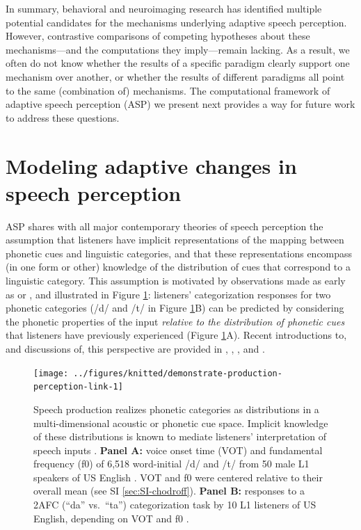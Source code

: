 \documentclass[
  11pt,
  man,floatsintext]{apa6}
\begin{document}
In summary, behavioral and neuroimaging research has identified multiple potential candidates for the mechanisms underlying adaptive speech perception. However, contrastive comparisons of competing hypotheses about these mechanisms---and the computations they imply---remain lacking. As a result, we often do not know whether the results of a specific paradigm clearly support one mechanism over another, or whether the results of different paradigms all point to the same (combination of) mechanisms. The computational framework of adaptive speech perception (ASP) we present next provides a way for future work to address these questions.

\section{Modeling adaptive changes in speech perception}\label{sec:framework}

ASP shares with all major contemporary theories of speech perception the assumption that listeners have implicit representations of the mapping between phonetic cues and linguistic categories, and that these representations encompass (in one form or other) knowledge of the distribution of cues that correspond to a linguistic category. This assumption is motivated by observations made as early as \textcite{abramson1973voice} or \textcite{nearey-hogan1986}, and illustrated in Figure \ref{fig:demonstrate-production-perception-link}: listeners' categorization responses for two phonetic categories (/d/ and /t/ in Figure \ref{fig:demonstrate-production-perception-link}B) can be predicted by considering the phonetic properties of the input \emph{relative to the distribution of phonetic cues} that listeners have previously experienced (Figure \ref{fig:demonstrate-production-perception-link}A). Recent introductions to, and discussions of, this perspective are provided in \textcite{bent-baeseberk2021}, \textcite{kurumada-roettger2021}, \textcite{quam-creel2021}, and \textcite{schertz-clare2020}.



\begin{figure}

{\centering \texttt{[image: ../figures/knitted/demonstrate-production-perception-link-1]} 

}

\caption{Speech production realizes phonetic categories as distributions in a multi-dimensional acoustic or phonetic cue space. Implicit knowledge of these distributions is known to mediate listeners' interpretation of speech inputs \autocite[for review, see][]{schertz-clare2020}. \textbf{Panel A:} voice onset time (VOT) and fundamental frequency (f0) of 6,518 word-initial /d/ and /t/ from 50 male L1 speakers of US English \autocite[data from][]{chodroff-wilson2018}. VOT and f0 were centered relative to their overall mean (see SI \ref{sec:SI-chodroff}). \textbf{Panel B:} responses to a 2AFC (``da'' vs.~``ta'') categorization task by 10 L1 listeners of US English, depending on VOT and f0 \autocite[data from Experiment 1 in][]{burchill-jaeger2022}.}\label{fig:demonstrate-production-perception-link}
\end{figure}
\end{document}
